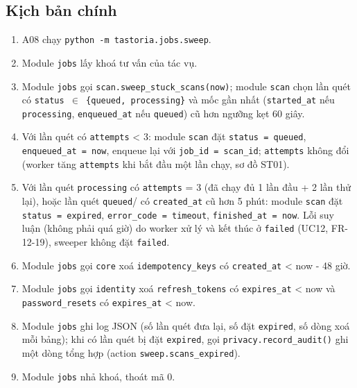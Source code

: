 \subsection{Kịch bản chính}
\begin{enumerate}
\item A08 chạy {\small\texttt{python -\allowbreak{}m tastoria.\allowbreak{}jobs.\allowbreak{}sweep}}.
\item Module {\small\texttt{jobs}} lấy khoá tư vấn của tác vụ.
\item Module {\small\texttt{jobs}} gọi {\small\texttt{scan.\allowbreak{}sweep\_\allowbreak{}\allowbreak{}stuck\_\allowbreak{}\allowbreak{}scans(now)}}; module {\small\texttt{scan}} chọn lần quét có {\small\texttt{status \ensuremath{\in} \{queued, processing\}}} và mốc gần nhất ({\small\texttt{started\_\allowbreak{}\allowbreak{}at}} nếu {\small\texttt{processing}}, {\small\texttt{enqueued\_\allowbreak{}\allowbreak{}at}} nếu {\small\texttt{queued}}) cũ hơn ngưỡng kẹt 60 giây.
\item Với lần quét có {\small\texttt{attempts}} < 3: module {\small\texttt{scan}} đặt {\small\texttt{status = queued}}, {\small\texttt{enqueued\_\allowbreak{}\allowbreak{}at = now}}, enqueue lại với {\small\texttt{job\_\allowbreak{}\allowbreak{}id = scan\_\allowbreak{}\allowbreak{}id}}; {\small\texttt{attempts}} không đổi (worker tăng {\small\texttt{attempts}} khi bắt đầu một lần chạy, sơ đồ ST01).
\item Với lần quét {\small\texttt{processing}} có {\small\texttt{attempts}} = 3 (đã chạy đủ 1 lần đầu + 2 lần thử lại), hoặc lần quét {\small\texttt{queued}}/ có {\small\texttt{created\_\allowbreak{}\allowbreak{}at}} cũ hơn 5 phút: module {\small\texttt{scan}} đặt {\small\texttt{status = expired}}, {\small\texttt{error\_\allowbreak{}\allowbreak{}code = timeout}}, {\small\texttt{finished\_\allowbreak{}\allowbreak{}at = now}}. Lỗi suy luận (không phải quá giờ) do worker xử lý và kết thúc ở {\small\texttt{failed}} (UC12, FR-\allowbreak{}12-\allowbreak{}19), sweeper không đặt {\small\texttt{failed}}.
\item Module {\small\texttt{jobs}} gọi {\small\texttt{core}} xoá {\small\texttt{idempotency\_\allowbreak{}\allowbreak{}keys}} có {\small\texttt{created\_\allowbreak{}\allowbreak{}at}} < now - 48 giờ.
\item Module {\small\texttt{jobs}} gọi {\small\texttt{identity}} xoá {\small\texttt{refresh\_\allowbreak{}\allowbreak{}tokens}} có {\small\texttt{expires\_\allowbreak{}\allowbreak{}at}} < now và {\small\texttt{password\_\allowbreak{}\allowbreak{}resets}} có {\small\texttt{expires\_\allowbreak{}\allowbreak{}at}} < now.
\item Module {\small\texttt{jobs}} ghi log JSON (số lần quét đưa lại, số đặt {\small\texttt{expired}}, số dòng xoá mỗi bảng); khi có lần quét bị đặt {\small\texttt{expired}}, gọi {\small\texttt{privacy.\allowbreak{}record\_\allowbreak{}\allowbreak{}audit()}} ghi một dòng tổng hợp (action {\small\texttt{sweep.\allowbreak{}scans\_\allowbreak{}\allowbreak{}expired}}).
\item Module {\small\texttt{jobs}} nhả khoá, thoát mã 0.
\end{enumerate}
